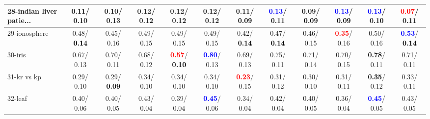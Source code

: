 \begin{table}[h]
\begin{center}
{\begin{tabular}{lc|c|c|c|c|c|c|c|c|c|c}
28-indian liver patie... &   0.11/  0.10 &   0.10/  0.13 &   0.12/  0.12 &   0.12/  0.12 &   0.12/  0.12 &   0.11/\textcolor{black}{\textbf{  0.09}} & \textcolor{blue}{\textbf{  0.13}}/  0.11 &   0.09/\textcolor{black}{\textbf{  0.09}} & \textcolor{blue}{\textbf{  0.13}}/\textcolor{black}{\textbf{  0.09}} & \textcolor{blue}{\textbf{  0.13}}/  0.10 & \textcolor{red}{\textbf{  0.07}}/  0.11 \\ \hline
29-ionosphere &   0.48/\textcolor{black}{\textbf{  0.14}} &   0.45/  0.16 &   0.49/  0.15 &   0.49/  0.15 &   0.49/  0.15 &   0.42/\textcolor{black}{\textbf{  0.14}} &   0.47/\textcolor{black}{\textbf{  0.14}} &   0.46/  0.15 & \textcolor{red}{\textbf{  0.35}}/  0.16 &   0.50/  0.16 & \textcolor{blue}{\textbf{  0.53}}/\textcolor{black}{\textbf{  0.14}} \\
30-iris &   0.67/  0.13 &   0.70/  0.11 &   0.68/  0.12 & \textcolor{red}{\textbf{  0.57}}/\textcolor{black}{\textbf{  0.10}} & \underline{\textcolor{blue}{\textbf{  0.80}}}/  0.13 &   0.69/  0.13 &   0.75/  0.11 &   0.71/  0.14 &   0.70/  0.15 & \textcolor{black}{\textbf{  0.78}}/  0.11 &   0.71/  0.11 \\
31-kr vs kp &   0.29/  0.10 &   0.29/\textcolor{black}{\textbf{  0.09}} &   0.34/  0.10 &   0.34/  0.10 &   0.34/  0.10 & \textcolor{red}{\textbf{  0.23}}/  0.15 &   0.31/  0.12 &   0.30/  0.10 &   0.31/  0.11 & \textcolor{black}{\textbf{  0.35}}/  0.12 &   0.33/  0.11 \\
32-leaf &   0.40/  0.06 &   0.40/  0.05 &   0.43/  0.04 &   0.39/  0.04 & \textcolor{blue}{\textbf{  0.45}}/  0.06 &   0.34/  0.04 &   0.42/  0.04 &   0.40/  0.05 &   0.36/  0.04 & \textcolor{blue}{\textbf{  0.45}}/  0.05 &   0.43/  0.05 \\\end{tabular}}\label{stratsALCKappa0aIELM}
\end{center}
\end{table}
